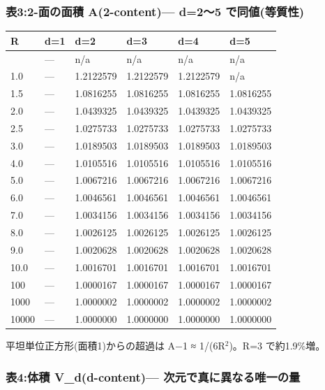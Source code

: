 \documentclass[
]{ltjsarticle}
\newcounter{none} %
\begin{document}
\subsubsection{表3:2-面の面積 A(2-content)--- d=2〜5
で同値(等質性)}\label{ux886832-ux9762ux306eux9762ux7a4d-a2-content-d25-ux3067ux540cux5024ux7b49ux8ceaux6027}

{\def\LTcaptype{none} %
\begin{longtable}[]{@{}llllll@{}}
\toprule\noalign{}
R & d=1 & d=2 & d=3 & d=4 & d=5 \\
\midrule\noalign{}
\endhead
\bottomrule\noalign{}
\endlastfoot
0.5 & --- & n/a & n/a & n/a & n/a \\
1.0 & --- & 1.2122579 & 1.2122579 & 1.2122579 & n/a \\
1.5 & --- & 1.0816255 & 1.0816255 & 1.0816255 & 1.0816255 \\
2.0 & --- & 1.0439325 & 1.0439325 & 1.0439325 & 1.0439325 \\
2.5 & --- & 1.0275733 & 1.0275733 & 1.0275733 & 1.0275733 \\
3.0 & --- & 1.0189503 & 1.0189503 & 1.0189503 & 1.0189503 \\
4.0 & --- & 1.0105516 & 1.0105516 & 1.0105516 & 1.0105516 \\
5.0 & --- & 1.0067216 & 1.0067216 & 1.0067216 & 1.0067216 \\
6.0 & --- & 1.0046561 & 1.0046561 & 1.0046561 & 1.0046561 \\
7.0 & --- & 1.0034156 & 1.0034156 & 1.0034156 & 1.0034156 \\
8.0 & --- & 1.0026125 & 1.0026125 & 1.0026125 & 1.0026125 \\
9.0 & --- & 1.0020628 & 1.0020628 & 1.0020628 & 1.0020628 \\
10.0 & --- & 1.0016701 & 1.0016701 & 1.0016701 & 1.0016701 \\
100 & --- & 1.0000167 & 1.0000167 & 1.0000167 & 1.0000167 \\
1000 & --- & 1.0000002 & 1.0000002 & 1.0000002 & 1.0000002 \\
10000 & --- & 1.0000000 & 1.0000000 & 1.0000000 & 1.0000000 \\
\end{longtable}
}

平坦単位正方形(面積1)からの超過は A−1 ≈ 1/(6R\(^{2}\))。R=3
で約1.9\%増。

\subsubsection{表4:体積 V\_d(d-content)---
次元で真に異なる唯一の量}\label{ux88684ux4f53ux7a4d-v_dd-content-ux6b21ux5143ux3067ux771fux306bux7570ux306aux308bux552fux4e00ux306eux91cf}
\end{document}
